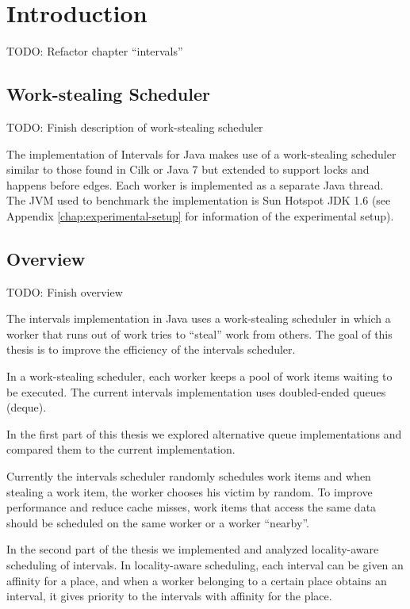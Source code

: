 
\chapter{Introduction}
\label{chap:introduction}

TODO: Refactor chapter ``intervals''


\section{Work-stealing Scheduler}
\label{sec:intro-work-stealing-scheduler}

TODO: Finish description of work-stealing scheduler

The implementation of Intervals for Java makes use of a work-stealing
scheduler similar to those found in Cilk \cite{Blumofe1995} or Java 7
\cite{Lea} but extended to support locks and happens before
edges. Each worker is implemented as a separate Java thread. The JVM
used to benchmark the implementation is Sun Hotspot JDK 1.6 (see
Appendix \ref{chap:experimental-setup} for information of the
experimental setup).


\section{Overview}
\label{sec:intro-overview}

TODO: Finish overview

The intervals implementation in Java uses a work-stealing scheduler in
which a worker that runs out of work tries to ``steal'' work from
others. The goal of this thesis is to improve the efficiency of the
intervals scheduler.


In a work-stealing scheduler, each worker keeps a pool of work items
waiting to be executed. The current intervals implementation uses
doubled-ended queues (deque).  

In the first part of this thesis we explored alternative queue
implementations and compared them to the current implementation.


Currently the intervals scheduler randomly schedules work items and
when stealing a work item, the worker chooses his victim by random. To
improve performance and reduce cache misses, work items that access
the same data should be scheduled on the same worker or a worker
``nearby''.

In the second part of the thesis we implemented and analyzed
locality-aware scheduling of intervals. In locality-aware scheduling,
each interval can be given an affinity for a place, and when a worker
belonging to a certain place obtains an interval, it gives priority to
the intervals with affinity for the place.

